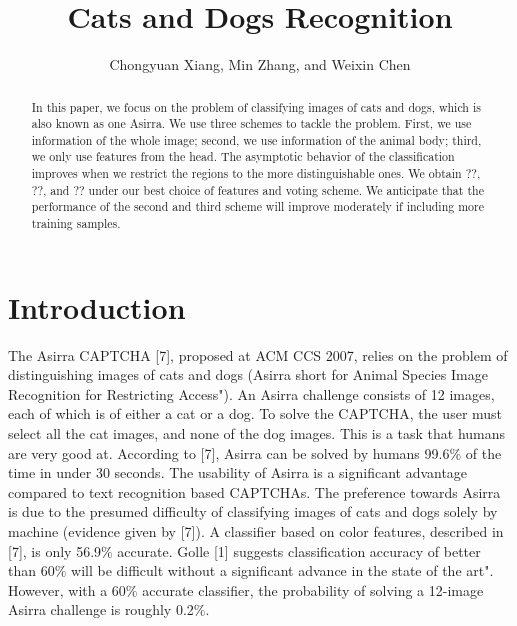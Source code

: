\documentclass[12pt]{article}
\title{Cats and Dogs Recognition}
\author{Chongyuan Xiang, Min Zhang, and Weixin Chen}
\begin{document}
\maketitle
\begin{abstract}
In this paper, we focus on the problem of classifying images of cats and dogs, which is also known as one Asirra. We use three schemes to tackle the problem. First, we use information of the whole image; second, we use information of the animal body; third, we only use features from the head. The asymptotic behavior of the classification improves when we restrict the regions to the more distinguishable ones. We obtain ??, ??, and ?? under our best choice of features and voting scheme.  We anticipate that the performance of the second and third scheme will improve moderately if including more training samples.    
\end{abstract}


\section{Introduction}
The Asirra CAPTCHA [7], proposed at ACM CCS 2007, relies on the problem of distinguishing images of cats and dogs (Asirra short for Animal Species Image Recognition for Restricting Access"). An Asirra challenge consists of 12 images, each of which is of either a cat or a dog. To solve the CAPTCHA, the user must select all the cat images, and none of the dog images. This is a task that humans are very good at. According to [7], Asirra can be solved by humans 99.6$\%$ of the time in under 30 seconds. The usability of Asirra is a significant advantage compared to text recognition based CAPTCHAs. The preference towards Asirra is due to the presumed difficulty of classifying images of cats and dogs solely by machine (evidence given by [7]). A classifier based on color features, described in [7], is only 56.9$\%$ accurate. Golle [1] suggests classification accuracy of better than 60$\%$ will be difficult without a significant advance in the state of the art". However, with a 60$\%$ accurate classifier, the probability of solving a 12-image Asirra challenge is roughly 0.2$\%$.
\end{document}
